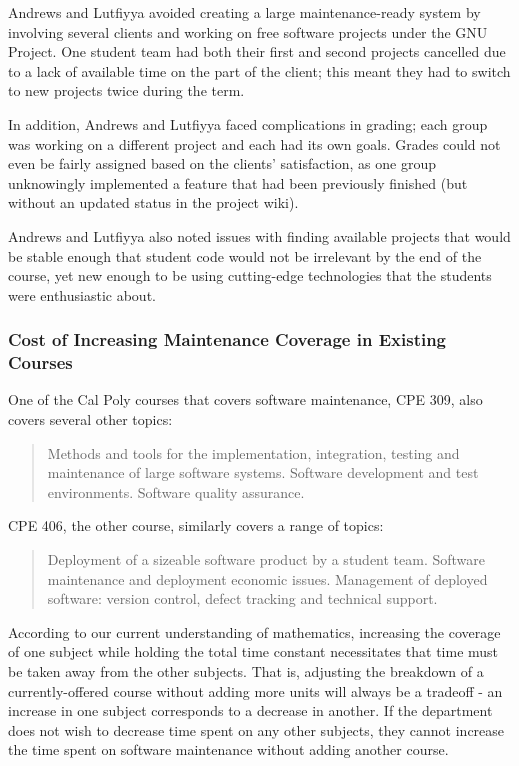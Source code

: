 \documentclass[11pt]{article}
\begin{document}
\begin{multicols}{2}
Andrews and Lutfiyya avoided creating a large maintenance-ready system by involving several clients and working on free software projects under the GNU Project.  One student team had both their first and second projects cancelled due to a lack of available time on the part of the client; this meant they had to switch to new projects twice during the term. \cite{andrews}

In addition, Andrews and Lutfiyya faced complications in grading; each group was working on a different project and each had its own goals. \cite{andrews}  Grades could not even be fairly assigned based on the clients' satisfaction, as one group unknowingly implemented a feature that had been previously finished (but without an updated status in the project wiki). \cite{andrews}

Andrews and Lutfiyya also noted issues with finding available projects that would be stable enough that student code would not be irrelevant by the end of the course, yet new enough to be using cutting-edge technologies that the students were enthusiastic about. \cite{andrews}


\subsubsection{Cost of Increasing Maintenance Coverage in Existing Courses}

One of the Cal Poly courses that covers software maintenance, CPE 309, also covers several other topics:

\begin{quote}
Methods and tools for the implementation, integration, testing and maintenance of large software systems. Software development and test environments. Software quality assurance. \cite{catalogCourses}
\end{quote}

CPE 406, the other course, similarly covers a range of topics:

\begin{quote}
Deployment of a sizeable software product by a student team. Software maintenance and deployment economic issues. Management of deployed software: version control, defect tracking and technical support. \cite{catalogCourses}
\end{quote}

According to our current understanding of mathematics, increasing the coverage of one subject while holding the total time constant necessitates that time must be taken away from the other subjects.  That is, adjusting the breakdown of a currently-offered course without adding more units will always be a tradeoff - an increase in one subject corresponds to a decrease in another.  If the department does not wish to decrease time spent on any other subjects, they cannot increase the time spent on software maintenance without adding another course.


\end{multicols}
\end{document}

